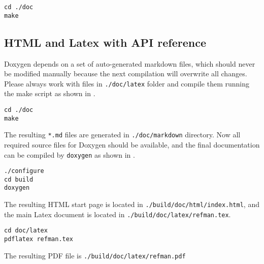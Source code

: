 \begin{lstlisting}[caption={Make ./README.md},label={code:doc:gfm}]
cd ./doc
make
\end{lstlisting}

\subsection{HTML and Latex with API reference}
Doxygen depends on a set of auto-generated markdown files, which should never be modified manually because the next compilation will overwrite all changes.
Please always work with files in \lstinline|./doc/latex| folder and compile them running the make script as shown in .

\begin{lstlisting}[caption={Markdown files generation},label={code:dox:doxy-markdown}]
cd ./doc
make
\end{lstlisting}

The resulting \lstinline|*.md| files are generated in \lstinline|./doc/markdown| directory.
Now all required source files for Doxygen should be available, and the final documentation can be compiled by \lstinline|doxygen| as shown in .

\begin{lstlisting}[caption={Make HTML and Latex documents},label={code:doc:doxygen}]
./configure
cd build
doxygen
\end{lstlisting}

The resulting HTML start page is located in \lstinline|./build/doc/html/index.html|, and the main Latex document is located in \lstinline|./build/doc/latex/refman.tex|.

\begin{lstlisting}[caption={Comple PDF with API reference},label={code:doc:doxygen:pdf}]
cd doc/latex
pdflatex refman.tex
\end{lstlisting}

The resulting PDF file is \lstinline|./build/doc/latex/refman.pdf|

